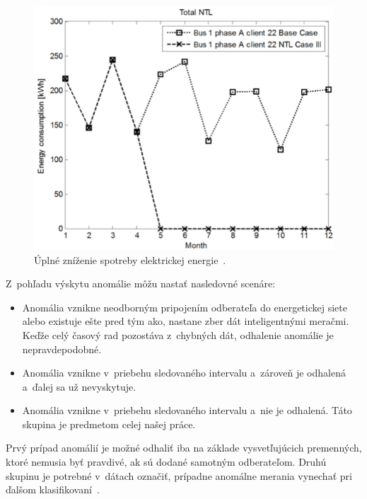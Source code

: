 \documentclass[a4paper,twoside,slovak,12pt,appendix]{article}
\begin{document}
\begin{figure}[htbp]
\begin{minipage}{0.45\textwidth}
\begin{center}
      \includegraphics[scale=0.33]{decrease-total.png}
			\caption[Úplné zníženie spotreby elektrickej energie.]{Úplné zníženie spotreby elektrickej energie~\cite{Trevizan2015}.}
			\label{fig:decrease-total}
    \end{center}
  \end{minipage}\hfill

\end{figure}

Z~pohľadu výskytu anomálie môžu nastať nasledovné scenáre:
\begin{itemize}
  \item Anomália vznikne neodborným pripojením odberateľa do energetickej siete alebo existuje ešte pred tým ako, nastane zber dát inteligentnými meračmi.
        Keďže celý časový rad pozostáva z~chybných dát, odhalenie anomálie je nepravdepodobné.
  \item Anomália vznikne v~priebehu sledovaného intervalu a~zároveň je odhalená a~ďalej sa už nevyskytuje.
  \item Anomália vznikne v~priebehu sledovaného intervalu a~nie je odhalená. Táto skupina je predmetom celej našej práce.
\end{itemize}
Prvý prípad anomálií je možné odhaliť iba na základe vysvetľujúcich premenných,
ktoré nemusia byť pravdivé, ak sú dodané samotným odberateľom. Druhú skupinu je
potrebné v~dátach označiť, prípadne anomálne merania vynechať pri ďalšom
klasifikovaní~\cite{Spiric2015}.

\end{document}

